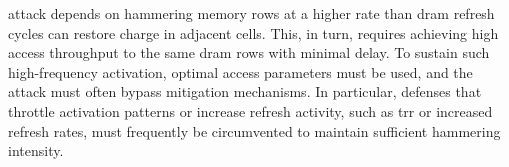 \begin{description}
      attack depends on hammering memory rows at a higher rate than \gls{dram} refresh cycles can restore 
      charge in adjacent cells. This, in turn, requires achieving high access throughput to the same 
      \gls{dram} rows with minimal delay. To sustain such high-frequency activation, optimal access parameters 
      must be used, and the attack must often bypass mitigation mechanisms. In particular, defenses that 
      throttle activation patterns or increase refresh activity, such as \gls{trr} or 
      increased refresh rates, must frequently be circumvented to maintain sufficient hammering intensity.
  \end{description}
  